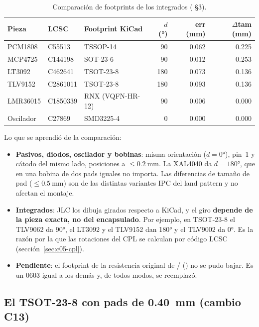 \begin{table}[h]
\centering
\footnotesize
\caption{Comparación de footprints de los integrados ( §3).}\label{tab:c05-fp}
\begin{tabular}{@{}lllrrr@{}}\toprule
Pieza & LCSC & Footprint KiCad & $d$ (\si{\degree}) & err (\si{\milli\meter}) & $\Delta$tam (\si{\milli\meter})\\\midrule
PCM1808 & C55513 & TSSOP-14 & 90 & \num{0.062} & \num{0.225}\\
MCP4725 & C144198 & SOT-23-6 & 90 & \num{0.012} & \num{0.253}\\
LT3092 & C462641 & TSOT-23-8 & 180 & \num{0.073} & \num{0.136}\\
TLV9152 & C2861011 & TSOT-23-8 & 180 & \num{0.093} & \num{0.136}\\
LMR36015 & C1850339 & RNX (VQFN-HR-12) & 90 & \num{0.006} & \num{0.000}\\
Oscilador & C27869 & SMD3225-4 & 0 & \num{0.000} & \num{0.000}\\
\bottomrule
\end{tabular}
\end{table}

Lo que se aprendió de la comparación:
\begin{itemize}
  \item \textbf{Pasivos, diodos, oscilador y bobinas}: misma orientación ($d=\ang{0}$), pin~1 y cátodo del mismo lado, posiciones a $\le\SI{0.2}{\milli\meter}$. La XAL4040 da $d=\ang{180}$, que en una bobina de dos pads iguales no importa. Las diferencias de tamaño de pad ($\le\SI{0.5}{\milli\meter}$) son de las distintas variantes IPC del land pattern y no afectan el montaje.
  \item \textbf{Integrados}: JLC los dibuja girados respecto a KiCad, y el giro \textbf{depende de la pieza exacta, no del encapsulado}. Por ejemplo, en TSOT-23-8 el TLV9062 da \ang{90}, el LT3092 y el TLV9152 dan \ang{180} y el TLV9002 da \ang{0}. Es la razón por la que las rotaciones del CPL se calculan por código LCSC (sección~\ref{sec:c05-cpl}).
  \item \textbf{Pendiente}: el footprint de la resistencia original de / () no se pudo bajar. Es un 0603 igual a los demás y, de todos modos, se reemplazó.
\end{itemize}

\subsection{El TSOT-23-8 con pads de \SI{0.40}{\milli\meter} (cambio C13)}\label{sec:c05-tsot}

